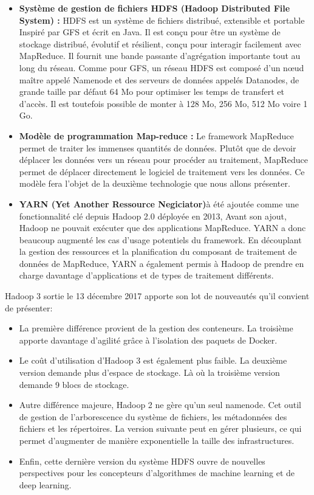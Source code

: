 \begin{enumerate}[label=\protect\ding{\value*}, start=182,font=\color{blue}]
\begin{itemize}[label=]
\item \textbf{Système de gestion de fichiers HDFS (Hadoop Distributed File System) :} HDFS est un système de fichiers distribué, extensible et portable Inspiré par GFS et écrit en Java. Il est conçu pour être un système de stockage distribué, évolutif et résilient, conçu pour interagir facilement avec MapReduce. Il fournit une bande passante d'agrégation importante tout au long du réseau. Comme pour GFS, un réseau HDFS est composé d'un nœud maître appelé Namenode et des serveurs de données appelés Datanodes, de grande taille par défaut 64 Mo pour optimiser les temps de transfert et d'accès. Il est toutefois possible de monter à 128 Mo, 256 Mo, 512 Mo voire 1 Go.
\item \textbf{Modèle de programmation Map-reduce :} Le framework MapReduce permet de traiter les immenses quantités de données. Plutôt que de devoir déplacer les données vers un réseau pour procéder au traitement, MapReduce permet de déplacer directement le logiciel de traitement vers les données. Ce modèle fera l'objet de la deuxième technologie que nous allons présenter.
\item \textbf{YARN (Yet Another Ressource Negiciator)}à été ajoutée comme une fonctionnalité clé depuis Hadoop 2.0 déployée en 2013, Avant son ajout, Hadoop ne pouvait exécuter que des applications MapReduce. YARN a donc beaucoup augmenté les cas d’usage potentiels du framework. En découplant la gestion des ressources et la planification du composant de traitement de données de MapReduce, YARN a également permis à Hadoop de prendre en charge davantage d’applications et de types de traitement différents.

\end{itemize}

Hadoop 3 sortie le 13 décembre 2017 apporte son lot de nouveautés qu’il convient de présenter:
\begin{itemize}[label=\textbullet]
\item La première différence provient de la gestion des conteneurs. La troisième apporte davantage d’agilité grâce à l’isolation des paquets de Docker.
\item Le coût d’utilisation d’Hadoop 3 est également plus faible. La deuxième version demande plus d’espace de stockage. Là où la troisième version demande 9 blocs de  stockage.
\item Autre différence majeure, Hadoop 2 ne gère qu’un seul namenode. Cet outil de gestion de l’arborescence du système de fichiers, les métadonnées des fichiers et les répertoires. La version suivante peut en gérer plusieurs, ce qui permet d’augmenter de manière exponentielle la taille des infrastructures.
\item Enfin, cette dernière version du système HDFS ouvre de nouvelles perspectives pour les concepteurs d’algorithmes de machine learning et de deep learning. 
\end{itemize}


\end{enumerate}
